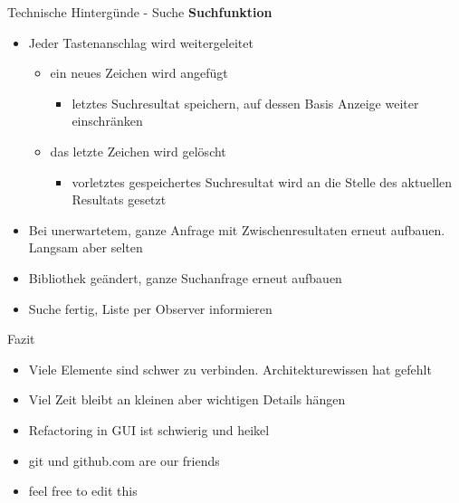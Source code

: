 \documentclass[]{beamer}
\begin{document}
\begin{frame}{Technische Hintergünde - Suche}
\textbf{Suchfunktion}
\begin{itemize}
\item<1-> Jeder Tastenanschlag wird weitergeleitet
  \begin{itemize}
  \item<2-> ein neues Zeichen wird angefügt
      \begin{itemize}
	\item<3-> letztes Suchresultat speichern, auf dessen Basis Anzeige weiter einschränken
      \end{itemize}
    \item<4-> das letzte Zeichen wird gelöscht
      \begin{itemize}
	\item<5-> vorletztes gespeichertes Suchresultat wird an die Stelle des aktuellen Resultats gesetzt
      \end{itemize}
  \end{itemize}
\item<6-> Bei unerwartetem, ganze Anfrage mit Zwischenresultaten erneut aufbauen. Langsam aber selten
\item<7-> Bibliothek geändert, ganze Suchanfrage erneut aufbauen
\item<8-> Suche fertig, Liste per Observer informieren
\end{itemize}
\end{frame}

\begin{frame}{Fazit}
\begin{itemize}
 \item Viele Elemente sind schwer zu verbinden. Architekturewissen hat gefehlt
 \item Viel Zeit bleibt an kleinen aber wichtigen Details hängen
 \item Refactoring in GUI ist schwierig und heikel
 \item git und github.com are our friends
 \item feel free to edit this
\end{itemize}

\end{frame}
\end{document}
